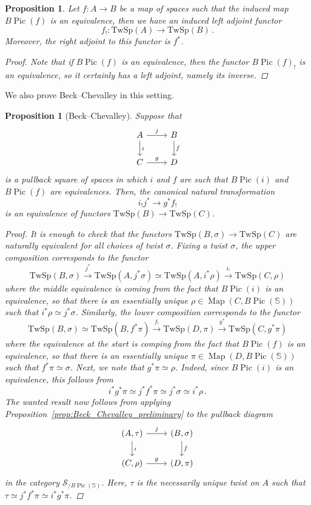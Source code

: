 \documentclass[10pt]{amsart}
\newcommand{\longto}{\longrightarrow}
\theoremstyle{plain}
\newtheorem{proposition}[theorem]{Proposition}
\theoremstyle{definition}
\DeclareMathOperator{\Pic}{Pic}
\DeclareMathOperator{\Map}{Map}
\newcommand{\bS}{\mathbb{S}}
\newcommand{\TwSp}{\mathrm{TwSp}}
\newcommand{\cS}{\mathcal{S}}
\begin{document}
\begin{proposition} \label{prop:total_pullback_no_left_adjoint}
 Let $f : A \to B$ be a map of spaces such that the induced map $B\Pic(f)$ is an equivalence, then we have an induced left adjoint functor
 \[
 f_! : \TwSp(A) \to \TwSp(B) \,.
 \]
 Moreover, the right adjoint to this functor is $f^*$.
 \begin{proof}
   Note that if $B\Pic(f)$ is an equivalence, then the functor $B\Pic(f)_!$ is an equivalence, so it certainly has a left adjoint, namely its inverse.
 \end{proof}
\end{proposition}

We also prove Beck--Chevalley in this setting.

\begin{proposition}[Beck--Chevalley] \label{prop:BC_total_cat}
  Suppose that
  \[
  \begin{tikzcd}
  A \arrow[r,"j"] \arrow[d,"i"] & B \arrow[d,"f"] \\
  C \arrow[r,"g"] & D
  \end{tikzcd}
  \]
  is a pullback square of spaces in which $i$ and $f$ are such that $B\Pic(i)$ and $B\Pic(f)$ are equivalences. Then, the canonical natural transformation
  \[
  i_! j^* \longto g^* f_!
  \]
  is an equivalence of functors $\TwSp(B) \to \TwSp(C)$.
  \begin{proof}
    It is enough to check that the functors $\TwSp(B,\sigma) \to \TwSp(C)$ are naturally equivalent for all choices of twist $\sigma$.
    Fixing a twist $\sigma$, the upper composition corresponds to the functor
    \[
    \TwSp(B,\sigma) \overset{j^*}\longto \TwSp(A,j^* \sigma) \simeq \TwSp(A,i^* \rho) \overset{i_!}\longto \TwSp(C,\rho)
    \]
    where the middle equivalence is coming from the fact that $B\Pic(i)$ is an equivalence, so that there is an essentially unique $\rho \in \Map(C,B\Pic(\bS))$ such that $i^* \rho \simeq j^* \sigma$.
    Similarly, the lower composition corresponds to the functor
    \[
    \TwSp(B,\sigma) \simeq \TwSp(B,f^* \pi) \overset{f_!}\longto \TwSp(D,\pi) \overset{g^*}\longto \TwSp(C,g^* \pi)
    \]
    where the equivalence at the start is comping from the fact that $B\Pic(f)$ is an equivalence, so that there is an essentially unique $\pi \in \Map(D,B\Pic(\bS))$ such that $f^*\pi \simeq \sigma$.
    Next, we note that $g^* \pi \simeq \rho$.
    Indeed, since $B\Pic(i)$ is an equivalence, this follows from
    \[
    i^* g^* \pi \simeq j^* f^* \pi \simeq j^* \sigma \simeq i^* \rho \,.
    \]
    The wanted result now follows from applying Proposition~\ref{prop:Beck_Chevalley_preliminary} to the pullback diagram
    \[
    \begin{tikzcd}
    (A,\tau) \arrow[r,"j"] \arrow[d,"i"] & (B,\sigma) \arrow[d,"f"] \\
    (C,\rho) \arrow[r,"g"] & (D,\pi)
    \end{tikzcd}
    \]
    in the category $\cS_{/B\Pic(\bS)}$. Here, $\tau$ is the necessarily unique twist on $A$ such that $\tau \simeq j^* f^* \pi \simeq i^* g^* \pi$.
  \end{proof}
\end{proposition}
\end{document}
